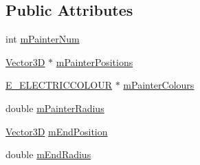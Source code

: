 \subsection*{Public Attributes}
\begin{DoxyCompactItemize}
\item 
int \hyperlink{class_item_data_ad34492f2bef4ac472141c8c2f49a4453}{m\-Painter\-Num}
\item 
\hyperlink{class_vector3_d}{Vector3\-D} $\ast$ \hyperlink{class_item_data_a143e1354591086a1eccfa88a88142d80}{m\-Painter\-Positions}
\item 
\hyperlink{_electric_colour_8hpp_a1979e84576b59c4d100d8a8cc41de734}{E\-\_\-\-E\-L\-E\-C\-T\-R\-I\-C\-C\-O\-L\-O\-U\-R} $\ast$ \hyperlink{class_item_data_a96be973680b6a94519f07a7a660fd6f6}{m\-Painter\-Colours}
\item 
double \hyperlink{class_item_data_a44cc64e866c902fb5999e3169b440372}{m\-Painter\-Radius}
\item 
\hyperlink{class_vector3_d}{Vector3\-D} \hyperlink{class_item_data_a33649729ff05366dc714a903eafe7e47}{m\-End\-Position}
\item 
double \hyperlink{class_item_data_a0ba449b337e0596bd1401d6318cc1b8e}{m\-End\-Radius}
\end{DoxyCompactItemize}


